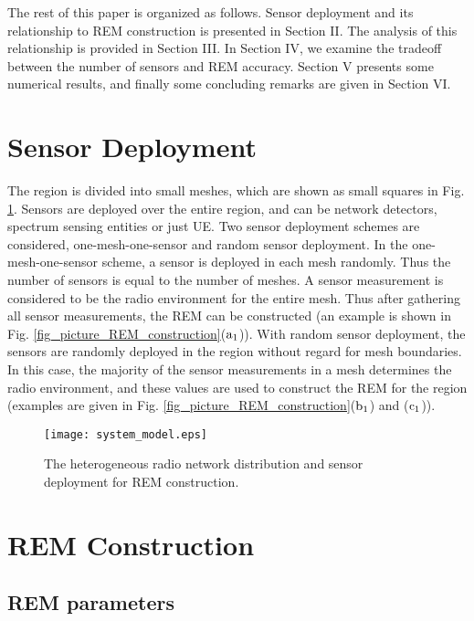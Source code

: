 \documentclass[conference]{IEEEtran}
\begin{document}
The rest of this paper is organized as follows.
Sensor deployment and its relationship to REM construction is presented in Section II.
The analysis of this relationship is provided in Section III.
In Section IV, we examine the tradeoff between the number of sensors and REM accuracy.
Section V presents some numerical results, and finally some concluding remarks are given in Section VI.

\section{Sensor Deployment}

The region is divided into small meshes, which are shown as small squares in Fig. \ref{fig_system_model}.
Sensors are deployed over the entire region, and can be network detectors, spectrum sensing entities or just UE.
Two sensor deployment schemes are considered, one-mesh-one-sensor and random sensor deployment.
In the one-mesh-one-sensor scheme, a sensor is deployed in each mesh randomly.
Thus the number of sensors is equal to the number of meshes.
A sensor measurement is considered to be the radio environment for the entire mesh.
Thus after gathering all sensor measurements, the REM can be constructed (an example is shown in Fig. \ref{fig_picture_REM_construction}($\rm{a_1}$)).
With random sensor deployment, the sensors are randomly deployed in the region without regard for mesh boundaries.
In this case, the majority of the sensor measurements in a mesh determines the radio environment, and these values are
used to construct the REM for the region (examples are given in Fig. \ref{fig_picture_REM_construction}($\rm{b_1}$) and ($\rm{c_1}$)).

\begin{figure}[!t]
\centering
\texttt{[image: system\_model.eps]}
\caption{The heterogeneous radio network distribution and sensor deployment for REM construction.} \label{fig_system_model}
\end{figure}

\section{REM Construction}

\subsection{REM parameters}
\end{document}
